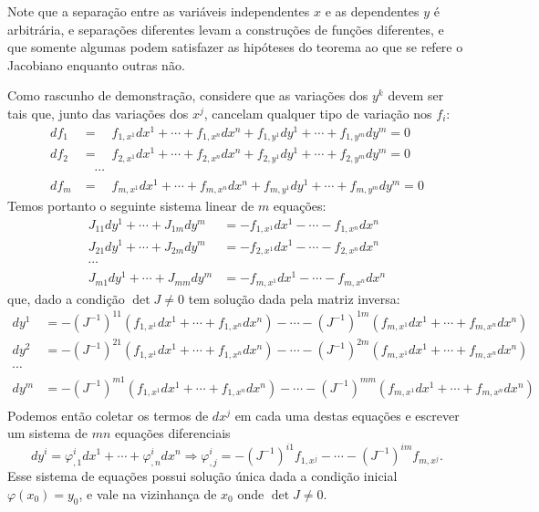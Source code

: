 Note que a separação entre as variáveis independentes $x$ e as dependentes $y$ é
arbitrária, e separações diferentes levam a construções de funções diferentes, e
que somente algumas podem satisfazer as hipóteses do teorema ao que se refere o
Jacobiano enquanto outras não.

Como rascunho de demonstração, considere que as variações dos $y^k$ devem ser
tais que, junto das variações dos $x^j$, cancelam qualquer tipo de variação nos
$f_i$:
\begin{align*}
    df_1&=\quad f_{1,x^1}dx^1+\cdots+
    f_{1,x^n}dx^n+f_{1,y^1}dy^1+\cdots+f_{1,y^m}dy^m=0\\
    df_2&=\quad f_{2,x^1}dx^1+\cdots+
    f_{2,x^n}dx^n+f_{2,y^1}dy^1+\cdots+f_{2,y^m}dy^m=0\\
    &\quad\cdots\\
    df_m&=\quad f_{m,x^1}dx^1+\cdots+
    f_{m,x^n}dx^n+f_{m,y^1}dy^1+\cdots+f_{m,y^m}dy^m=0
\end{align*}
Temos portanto o seguinte sistema linear de $m$ equações:
\begin{align*}
    J_{11}dy^1+\cdots+J_{1m}dy^m&=-f_{1,x^1}dx^1-\cdots-f_{1,x^n}dx^n\\
    J_{21}dy^1+\cdots+J_{2m}dy^m&=-f_{2,x^1}dx^1-\cdots-f_{2,x^n}dx^n\\
    \cdots&\\
    J_{m1}dy^1+\cdots+J_{mm}dy^m&=-f_{m,x^1}dx^1-\cdots-f_{m,x^n}dx^n
\end{align*}
que, dado a condição $\det J\neq0$ tem solução dada pela matriz inversa:
\begin{align*}
    dy^1&=-(J^{-1})^{11}\left(f_{1,x^1}dx^1+\cdots+f_{1,x^n}dx^n\right)-
    \cdots-(J^{-1})^{1m}\left(f_{m,x^1}dx^1+\cdots+f_{m,x^n}dx^n\right)\\
    dy^2&=-(J^{-1})^{21}\left(f_{1,x^1}dx^1+\cdots+f_{1,x^n}dx^n\right)-
    \cdots-(J^{-1})^{2m}\left(f_{m,x^1}dx^1+\cdots+f_{m,x^n}dx^n\right)\\
    \cdots&\\
    dy^m&=-(J^{-1})^{m1}\left(f_{1,x^1}dx^1+\cdots+f_{1,x^n}dx^n\right)-
    \cdots-(J^{-1})^{mm}\left(f_{m,x^1}dx^1+\cdots+f_{m,x^n}dx^n\right)\\
\end{align*}
Podemos então coletar os termos de $dx^j$ em cada uma destas equações e escrever
um sistema de $mn$ equações diferenciais
$$dy^i=\varphi^i_{,1}dx^1+\cdots+\varphi^i_{,n}dx^n \Rightarrow
\varphi^i_{,j}=-(J^{-1})^{i1}f_{1,x^j}-\cdots-(J^{-1})^{im}f_{m,x^j}.$$
Esse sistema de equações possui solução única dada a condição inicial $\varphi
(x_0)=y_0$, e vale na vizinhança de $x_0$ onde $\det J\neq0$.

